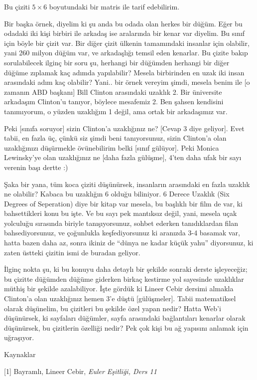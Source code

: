 \documentclass[12pt,fleqn]{article}\usepackage{../../common}
\begin{document}
Bu çiziti $5 \times 6$ boyutundaki bir matris ile tarif edebilirim. 

Bir başka örnek, diyelim ki şu anda bu odada olan herkes bir düğüm. Eğer bu
odadaki iki kişi birbiri ile arkadaş ise aralarında bir kenar var
diyelim. Bu sınıf için böyle bir çizit var. Bir diğer çizit ülkenin
tamamındaki insanlar için olabilir, yani 260 milyon düğüm var, ve
arkadaşlığı temsil eden kenarlar. Bu çizite bakıp sorulabilecek ilginç bir
soru şu, herhangi bir düğümden herhangi bir diğer düğüme zıplamak kaç
adımda yapılabilir? Mesela birbirinden en uzak iki insan arasındaki adım
kaç olabilir? Yani.. bir örnek vereyim şimdi, mesela benim ile [o zamanın
ABD başkanı] Bill Clinton arasındaki uzaklık 2. Bir üniversite arkadaşım
Clinton'u tanıyor, böylece mesafemiz 2. Ben şahsen kendisini tanımıyorum,
o yüzden uzaklığım 1 değil, ama ortak bir arkadaşımız var. 

Peki [sınıfa soruyor] sizin Clinton'a uzaklığınız ne? [Cevap 3 diye
geliyor]. Evet tabii, en fazla üç, çünkü siz şimdi beni tanıyorsunuz, sizin
Clinton'a olan uzaklığınızı düşürmekle övünebilirim belki [sınıf
gülüyor]. Peki Monica Lewinsky'ye olan uzaklığınız ne [daha fazla gülüşme],
4'ten daha ufak bir sayı verenin başı dertte :) 

Şaka bir yana, tüm koca çiziti düşünürsek, insanların arasındaki en fazla
uzaklık ne olabilir? Kabaca bu uzaklığın 6 olduğu biliniyor. 6 Derece
Uzaklık (Six Degrees of Seperation) diye bir kitap var mesela, bu başlıklı
bir film de var, ki bahsettikleri konu bu işte. Ve bu sayı pek mantıksız
değil, yani, mesela uçak yolculuğu sırasında biriyle tanışıyorsunuz, sohbet
ederken tanıdıklardan filan bahsediyorsunuz, ve çoğunlukla keşfediyorsunuz
ki aranızda 3-4 basamak var, hatta bazen daha az, sonra ikiniz de ``dünya
ne kadar küçük yahu'' diyorsunuz, ki zaten üstteki çizitin ismi de buradan
geliyor.

İlginç nokta şu, ki bu konuyu daha detaylı bir şekilde sonraki derste
işleyeceğiz; bu çizitte düğümden düğüme giderken birkaç kestirme yol
sayesinde uzaklıklar müthiş bir şekilde azalabiliyor. İşte gördük ki Lineer
Cebir dersimi almakla Clinton'a olan uzaklığınız hemen 3'e düştü
[gülüşmeler]. Tabii matematiksel olarak düşünelim, bu çizitleri bu şekilde
özel yapan nedir? Hatta Web'i düşünürsek, ki sayfaları düğümler, sayfa
arasındaki bağlantıları kenarlar olarak düşünürsek, bu çizitlerin özelliği
nedir? Pek çok kişi bu ağ yapısını anlamak için uğraşıyor. 

Kaynaklar

[1] Bayramlı, Lineer Cebir, {\em Euler Eşitliği, Ders 11} 
\end{document}
